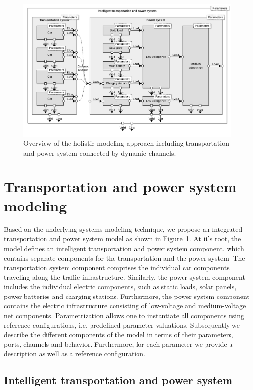\begin{figure}[b]
	\centering
	\includegraphics[width=\textwidth]{../gfx/model.pdf}
	\caption{Overview of the holistic modeling approach including transportation and power system connected by dynamic channels.}
	\label{fig:model}
\end{figure}

\section{Transportation and power system modeling}
\label{section:contribution}

Based on the underlying systems modeling technique, we propose an integrated transportation and power system model as shown in Figure~\ref{fig:model}. At it's root, the model defines an intelligent transportation and power system component, which contains separate components for the transportation and the power system. The transportation system component comprises the individual car components traveling along the traffic infrastructure. Similarly, the power system component includes the individual electric components, such as static loads, solar panels, power batteries and charging stations. Furthermore, the power system component contains the electric infrastructure consisting of low-voltage and medium-voltage net components. Parametrization allows one to instantiate all components using reference configurations, i.e. predefined parameter valuations. Subsequently we describe the different components of the model in terms of their parameters, ports, channels and behavior. Furthermore, for each parameter we provide a description as well as a reference configuration.

\subsection{Intelligent transportation and power system}


